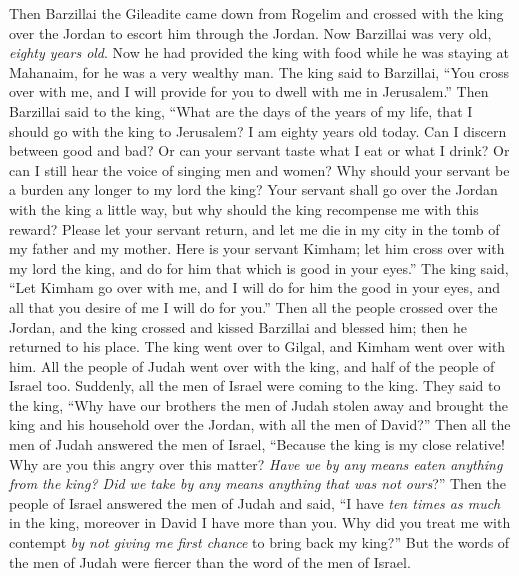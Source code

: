 \begin{biblechapter}
\verse Then Barzillai the Gileadite came down from Rogelim and crossed with the king over the Jordan to escort him through the Jordan.
\verse Now Barzillai was very old, \textit{eighty years old}. Now he had provided the king with food while he was staying at Mahanaim, for he was a very wealthy man.
\verse The king said to Barzillai, “You cross over with me, and I will provide for you to dwell with me in Jerusalem.”
\verse Then Barzillai said to the king, “What are the days of the years of my life, that I should go with the king to Jerusalem?
\verse I am eighty years old today. Can I discern between good and bad? Or can your servant taste what I eat or what I drink? Or can I still hear the voice of singing men and women? Why should your servant be a burden any longer to my lord the king?
\verse Your servant shall go over the Jordan with the king a little way, but why should the king recompense me with this reward?
\verse Please let your servant return, and let me die in my city in the tomb of my father and my mother. Here is your servant Kimham; let him cross over with my lord the king, and do for him that which is good in your eyes.”
\verse The king said, “Let Kimham go over with me, and I will do for him the good in your eyes, and all that you desire of me I will do for you.”
\verse Then all the people crossed over the Jordan, and the king crossed and kissed Barzillai and blessed him; then he returned to his place.
\verse The king went over to Gilgal, and Kimham went over with him. All the people of Judah went over with the king, and half of the people of Israel too.
\verse Suddenly, all the men of Israel were coming to the king. They said to the king, “Why have our brothers the men of Judah stolen away and brought the king and his household over the Jordan, with all the men of David?”
\verse Then all the men of Judah answered the men of Israel, “Because the king is my close relative! Why are you this angry over this matter? \textit{Have we by any means eaten anything from the king? Did we take by any means anything that was not ours}?”
\verse Then the people of Israel answered the men of Judah and said, “I have \textit{ten times as much} in the king, moreover in David I have more than you. Why did you treat me with contempt \textit{by not giving me first chance} to bring back my king?” But the words of the men of Judah were fiercer than the word of the men of Israel.
\end{biblechapter}

